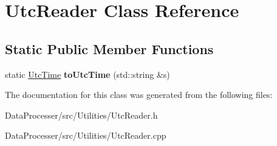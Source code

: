 \hypertarget{classUtcReader}{}\section{Utc\+Reader Class Reference}
\label{classUtcReader}
\subsection*{Static Public Member Functions}
\begin{DoxyCompactItemize}
\item 
\mbox{\label{classUtcReader_a31a33f96f4beac8f8d91086bd577edd3}} 
static \hyperlink{classUtcTime}{Utc\+Time} {\bfseries to\+Utc\+Time} (std\+::string \&s)
\end{DoxyCompactItemize}


The documentation for this class was generated from the following files\+:\begin{DoxyCompactItemize}
\item 
Data\+Processer/src/\+Utilities/Utc\+Reader.\+h\item 
Data\+Processer/src/\+Utilities/Utc\+Reader.\+cpp\end{DoxyCompactItemize}
